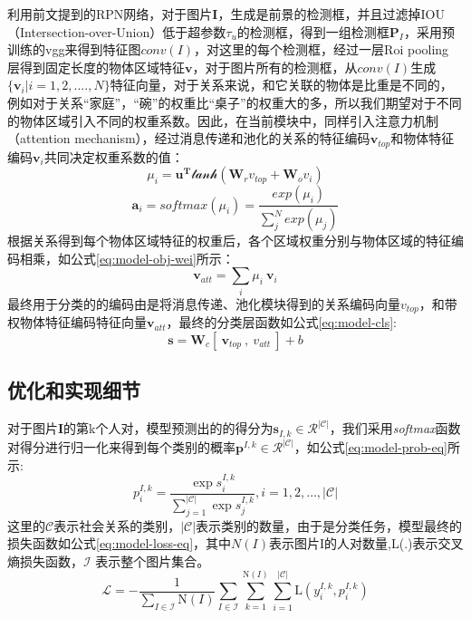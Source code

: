 利用前文提到的RPN网络，对于图片$\bm{I}$，生成是前景的检测框，并且过滤掉IOU（Intersection-over-Union）低于超参数$\tau_{u}$的检测框，得到一组检测框$\bm{P}_{I}$，采用预训练的vgg来得到特征图$conv(I)$，对这里的每个检测框，经过一层Roi pooling 层得到固定长度的物体区域特征$\mathbf{v}$，对于图片所有的检测框，从$conv(I)$生成$\{ \mathbf{v}_{i}|i=1,2,....,N\}$特征向量，对于关系来说，和它关联的物体是比重是不同的，例如对于关系``家庭''，``碗''的权重比``桌子''的权重大的多，所以我们期望对于不同的物体区域引入不同的权重系数。因此，在当前模块中，同样引入注意力机制
（attention mechanism），经过消息传递和池化的关系的特征编码$\mathbf{v}_{top}$和物体特征编码$\mathbf{v}_{i}$共同决定权重系数的值：
\begin{equation}
    \mu_{i} = \mathbf{u}^\mathbf{T}\mathcal{tanh}(\mathbf{W}_{r}v_{top}+\mathbf{W}_{o}v_{i})
\end{equation}
\begin{equation}
    \mathbf{a}_{i} = softmax(\mu_i) = \frac{exp(\mu_{i})}{\sum_{j}^{N}exp(\mu_{j})}
\end{equation}
根据关系得到每个物体区域特征的权重后，各个区域权重分别与物体区域的特征编码相乘，如公式\ref{eq:model-obj-wei}所示：
\begin{equation}
    \label{eq:model-obj-wei}
    \mathbf{v}_{att} = \sum_{i}\mu_{i}~\mathbf{v}_i
\end{equation}
最终用于分类的的编码由是将消息传递、池化模块得到的关系编码向量$v_{top}$，和带权物体特征编码特征向量$\mathbf{v}_{att}$，最终的分类层函数如公式\ref{eq:model-cls}:
\begin{equation}
    \label{eq:model-cls}
    \mathbf{s} = \mathbf{W}_{c}[~\mathbf{v}_{top}~,~v_{att}~] + b
\end{equation}

\subsection{优化和实现细节}

对于图片\textbf{I}的第k个人对，模型预测出的的得分为$\mathbf{s}_{I,k} \in \mathcal{R}^{|\mathcal{C}|}$，我们采用{\it softmax}函数对得分进行归一化来得到每个类别的概率$\mathbf{p}^{I,k} \in \mathcal{R}^{|\mathcal{C}|}$，如公式\ref{eq:model-prob-eq}所示:
\begin{equation}
  \label{eq:model-prob-eq}
  p_i^{I,k} = \frac{\exp{s_i^{I,k}}}{\sum_{j=1}^{|\mathcal{C}|}{\exp{s_j^{I,k}}}}, i=1,2,\dots,|\mathcal{C}|
\end{equation}
这里的$\mathcal{C}$表示社会关系的类别，$|\mathcal{C}|$表示类别的数量，由于是分类任务，模型最终的损失函数如公式\ref{eq:model-loss-eq}，其中$N(I)$表示图片I的人对数量,L(.)表示交叉熵损失函数，$\mathcal{I}$ 表示整个图片集合。
\begin{equation}
  \label{eq:model-loss-eq}
  \mathcal{L} = - \frac{1}{\sum_{I \in \mathcal{I}}\text{N}(I)} \sum_{I \in \mathcal{I}} \sum_{k=1}^{\text{N}(I)} \sum_{i=1}^{|\mathcal{C}|} \text{L}(y_{i}^{I,k}, p_{i}^{I,k})
\end{equation}

